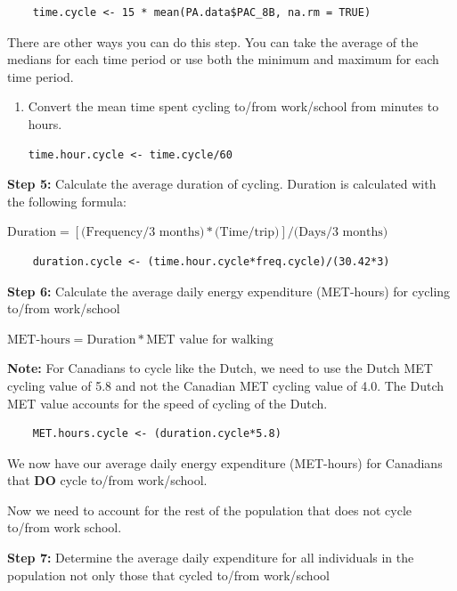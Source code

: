 \documentclass[]{book}
\begin{document}
\begin{verbatim}
    time.cycle <- 15 * mean(PA.data$PAC_8B, na.rm = TRUE)
\end{verbatim}

There are other ways you can do this step. You can take the average of
the medians for each time period or use both the minimum and maximum for
each time period.

\begin{enumerate}
\def\labelenumi{\alph{enumi}.}
\setcounter{enumi}{2}
\item
  Convert the mean time spent cycling to/from work/school from minutes
  to hours.

\begin{verbatim}
time.hour.cycle <- time.cycle/60
\end{verbatim}
\end{enumerate}

\textbf{Step 5:} Calculate the average duration of cycling. Duration is
calculated with the following formula:

\(\text{Duration} = [\text{(Frequency/3 months)}*\text{(Time/trip)}] / \text{(Days/3 months)}\)

\begin{verbatim}
    duration.cycle <- (time.hour.cycle*freq.cycle)/(30.42*3)
\end{verbatim}

\textbf{Step 6:} Calculate the average daily energy expenditure
(MET-hours) for cycling to/from work/school

\(\text{MET-hours} = \text{Duration}*\text{MET value for walking}\)

\textbf{Note:} For Canadians to cycle like the Dutch, we need to use the
Dutch MET cycling value of 5.8 and not the Canadian MET cycling value of
4.0. The Dutch MET value accounts for the speed of cycling of the Dutch.

\begin{verbatim}
    MET.hours.cycle <- (duration.cycle*5.8)
\end{verbatim}

We now have our average daily energy expenditure (MET-hours) for
Canadians that \textbf{DO} cycle to/from work/school.

Now we need to account for the rest of the population that does not
cycle to/from work school.

\textbf{Step 7:} Determine the average daily expenditure for all
individuals in the population not only those that cycled to/from
work/school
\end{document}
